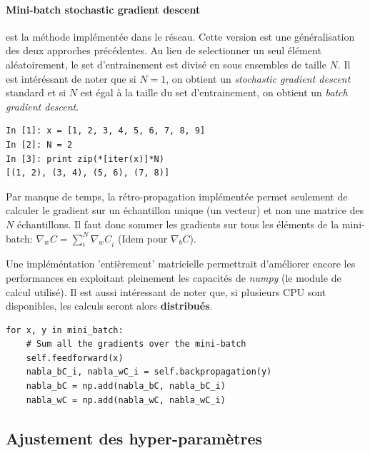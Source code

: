 \documentclass[11pt]{article}
\begin{document}
\paragraph{Mini-batch stochastic gradient descent} est la m\'ethode impl\'ement\'ee
dans le r\'eseau. Cette version est une g\'en\'eralisation des deux approches
pr\'ec\'edentes. Au lieu de selectionner un seul \'el\'ement al\'eatoirement,
le set d'entrainement est divis\'e en sous ensembles de taille $N$. Il est
int\'er\'essant de noter que si $N=1$, on obtient un {\em stochastic gradient descent}
standard et si $N$ est \'egal \`a la taille du set d'entrainement, on obtient un
{\em batch gradient descent}.

\begin{lstlisting}
In [1]: x = [1, 2, 3, 4, 5, 6, 7, 8, 9]
In [2]: N = 2
In [3]: print zip(*[iter(x)]*N)
[(1, 2), (3, 4), (5, 6), (7, 8)]
\end{lstlisting}

Par manque de temps, la r\'etro-propagation impl\'ement\'ee permet seulement de
calculer le gradient sur un \'echantillon unique (un vecteur) et non une matrice
des $N$ \'echantillons. Il faut donc sommer les gradients sur tous les \'el\'ements de
la mini-batch:
$
		\nabla_wC = \sum_{i}^{N}{{\nabla_wC}_i}
$ (Idem pour $\nabla_bC$).

Une impl\'em\'entation 'enti\`erement' matricielle permettrait d'am\'eliorer encore
les performances en exploitant pleinement les capacit\'es de \emph{numpy}
(le module de calcul utilis\'e). Il est aussi int\'eressant de noter que,
si plusieurs CPU sont disponibles, les calculs seront alors {\bf distribu\'es}.
\begin{lstlisting}
for x, y in mini_batch:
	# Sum all the gradients over the mini-batch
	self.feedforward(x)
	nabla_bC_i, nabla_wC_i = self.backpropagation(y)
	nabla_bC = np.add(nabla_bC, nabla_bC_i)
	nabla_wC = np.add(nabla_wC, nabla_wC_i)
\end{lstlisting}

\newpage
\subsection{Ajustement des hyper-param\`etres}
\end{document}
